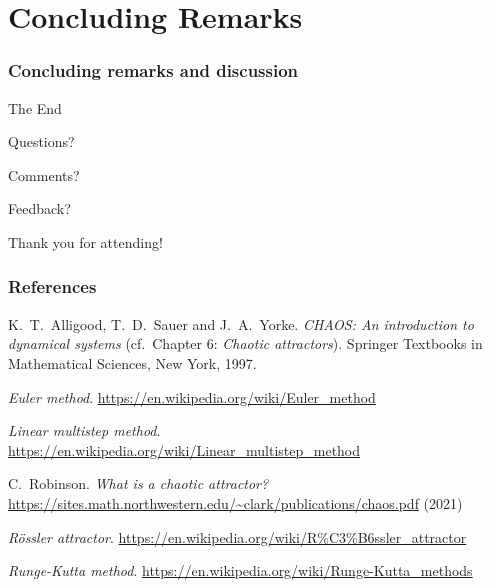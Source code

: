 \documentclass[usenames,svgnames,dvipsnames,10pt]{beamer}
\begin{document}
\section{Concluding Remarks} 

\begin{frame}
\frametitle{Concluding remarks and discussion} 

     \Huge{\centerline{The End}}\smallskip
     \Large{\centerline{Questions?}}\smallskip
     \Large{\centerline{Comments?}}\smallskip
     \Large{\centerline{Feedback?}}\bigskip
     \Huge{\centerline{Thank you for attending!}} 

\end{frame}

\begin{frame}[t,allowframebreaks] 
\frametitle{References} 

\footnotesize 
\begin{thebibliography}{10}

K.~T.~Alligood, T.~D.~Sauer and J.~A.~Yorke. 
\emph{CHAOS: An introduction to dynamical systems} 
(cf.\ Chapter 6: \emph{Chaotic attractors}). 
Springer Textbooks in Mathematical Sciences, New York, 1997. 

\emph{Euler method}. \url{https://en.wikipedia.org/wiki/Euler_method}

\emph{Linear multistep method}. \url{https://en.wikipedia.org/wiki/Linear_multistep_method} 

C.~Robinson. \emph{What is a chaotic attractor?} 
\url{https://sites.math.northwestern.edu/~clark/publications/chaos.pdf} (2021)

\emph{R\"ossler attractor}. \url{https://en.wikipedia.org/wiki/R\%C3\%B6ssler_attractor}

\emph{Runge-Kutta method}. \url{https://en.wikipedia.org/wiki/Runge-Kutta_methods} 

\end{thebibliography}

\end{frame} 

\end{document}
